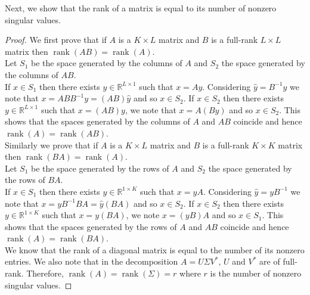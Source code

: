 \documentclass[11pt]{article}
\DeclareMathOperator{\rank}{rank}
\newcommand{\real}{\mathbb{R}} %
\begin{document}
Next, we show that the rank of a matrix is equal to its number of nonzero singular values.
\begin{proof}
    We first prove that if $A$ is a $K\times L$ matrix and $B$ is a full-rank $L\times L$ matrix then $\rank(AB)=\rank(A)$.\\
    Let $S_1$ be the space generated by the columns of $A$ and $S_2$ the space generated by the columns of $AB$.\\
    If $x\in S_1$ then there exists $y\in \real^{L\times 1}$ such that $x=Ay$. Considering $\hat{y}=B^{-1}y$ we note that $x=ABB^{-1}y=(AB)\hat{y}$ and so $x\in S_2$. If $x\in S_2$ then there exists $y\in \real^{L\times 1}$ such that $x=(AB)y$, we note that $x=A(By)$ and so $x\in S_2$. This shows that the spaces generated by the columns of $A$ and $AB$ coincide and hence $\rank(A)=\rank(AB)$.\\
    Similarly we prove that if $A$ is a $K\times L$ matrix and $B$ is a full-rank $K\times K$ matrix then $\rank(BA)=\rank(A)$.\\
    Let $S_1$ be the space generated by the rows of $A$ and $S_2$ the space generated by the rows of $BA$.\\
    If $x\in S_1$ then there exists $y\in \real^{1\times K}$ such that $x=yA$. Considering $\hat{y}=yB^{-1}$ we note that $x=yB^{-1}BA=\hat{y}(BA)$ and so $x\in S_2$. If $x\in S_2$ then there exists $y\in \real^{1\times K}$ such that $x=y(BA)$, we note $x=(yB)A$ and so $x\in S_1$. This shows that the spaces generated by the rows of $A$ and $AB$ coincide and hence $\rank(A)=\rank(BA)$.\\
	We know that the rank of a diagonal matrix is equal to the number of its nonzero entries.
	We also note that in the decomposition \(A = U \Sigma V^*\), \(U\) and \(V^*\) are of full-rank.
	Therefore, \(\rank(A) = \rank(\Sigma) = r\) where $r$ is the number of nonzero singular values.
\end{proof}
\end{document}
